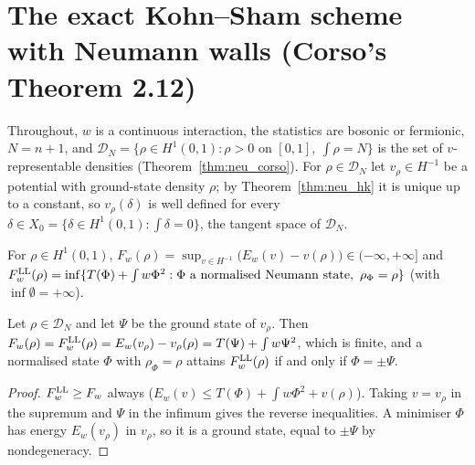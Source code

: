 \section{The exact Kohn--Sham scheme with Neumann walls (Corso's Theorem 2.12)}


Throughout, $w$ is a continuous interaction, the statistics are bosonic or fermionic, $N=n+1$, and
$\mathcal D_N=\{\rho\in H^1(0,1):\rho>0\text{ on }[0,1],\ \int\rho=N\}$ is the set of $v$-representable densities
(Theorem~\ref{thm:neu_corso}). For $\rho\in\mathcal D_N$ let $v_\rho\in H^{-1}$ be a potential with ground-state density
$\rho$; by Theorem~\ref{thm:neu_hk} it is unique up to a constant, so $v_\rho(\delta)$ is well defined for every
$\delta\in X_0=\{\delta\in H^1(0,1):\int\delta=0\}$, the tangent space of $\mathcal D_N$.

\begin{definition}
  \label{def:neu_lieb}
  \leanok
  For $\rho\in H^1(0,1)$,
  $F_w(\rho)=\sup_{v\in H^{-1}}\bigl(E_w(v)-v(\rho)\bigr)\in(-\infty,+\infty]$ and
  $F^{\rm LL}_w(\rho)=\inf\{T(\Phi)+\int w\Phi^2:\Phi\text{ a normalised Neumann state},\ \rho_\Phi=\rho\}$
  (with $\inf\emptyset=+\infty$).
\end{definition}

\begin{theorem}[Lieb $=$ Levy--Lieb on $\mathcal D_N$]
  \label{thm:neu_lieb_eq}
  \leanok
  Let $\rho\in\mathcal D_N$ and let $\Psi$ be the ground state of $v_\rho$. Then
  $F_w(\rho)=F^{\rm LL}_w(\rho)=E_w(v_\rho)-v_\rho(\rho)=T(\Psi)+\int w\Psi^2$, which is finite, and a normalised state
  $\Phi$ with $\rho_\Phi=\rho$ attains $F^{\rm LL}_w(\rho)$ if and only if $\Phi=\pm\Psi$.
\end{theorem}
\begin{proof}
  \leanok
  $F^{\rm LL}_w\ge F_w$ always ($E_w(v)\le T(\Phi)+\int w\Phi^2+v(\rho)$). Taking $v=v_\rho$ in the supremum and $\Psi$ in the
  infimum gives the reverse inequalities. A minimiser $\Phi$ has energy $E_w(v_\rho)$ in $v_\rho$, so it is a ground state,
  equal to $\pm\Psi$ by nondegeneracy.
\end{proof}

